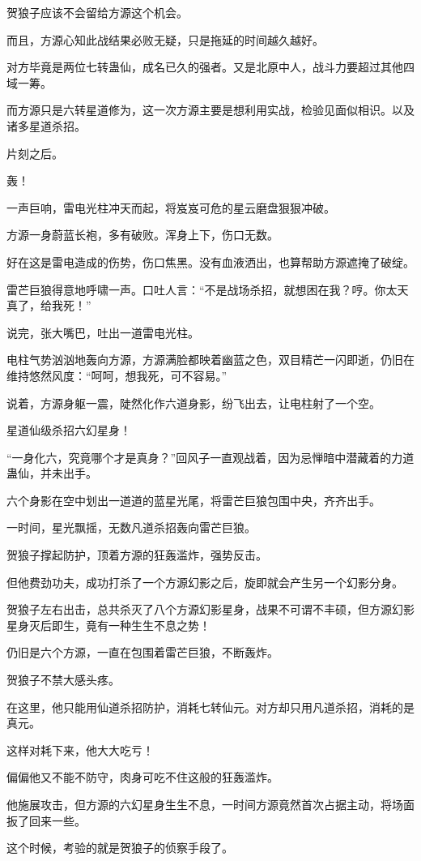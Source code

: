 \begin{this_body}
贺狼子应该不会留给方源这个机会。

而且，方源心知此战结果必败无疑，只是拖延的时间越久越好。

对方毕竟是两位七转蛊仙，成名已久的强者。又是北原中人，战斗力要超过其他四域一筹。

而方源只是六转星道修为，这一次方源主要是想利用实战，检验见面似相识。以及诸多星道杀招。

片刻之后。

轰！

一声巨响，雷电光柱冲天而起，将岌岌可危的星云磨盘狠狠冲破。

方源一身蔚蓝长袍，多有破败。浑身上下，伤口无数。

好在这是雷电造成的伤势，伤口焦黑。没有血液洒出，也算帮助方源遮掩了破绽。

雷芒巨狼得意地呼啸一声。口吐人言：“不是战场杀招，就想困在我？哼。你太天真了，给我死！”

说完，张大嘴巴，吐出一道雷电光柱。

电柱气势汹汹地轰向方源，方源满脸都映着幽蓝之色，双目精芒一闪即逝，仍旧在维持悠然风度：“呵呵，想我死，可不容易。”

说着，方源身躯一震，陡然化作六道身影，纷飞出去，让电柱射了一个空。

星道仙级杀招六幻星身！

“一身化六，究竟哪个才是真身？”回风子一直观战着，因为忌惮暗中潜藏着的力道蛊仙，并未出手。

六个身影在空中划出一道道的蓝星光尾，将雷芒巨狼包围中央，齐齐出手。

一时间，星光飘摇，无数凡道杀招轰向雷芒巨狼。

贺狼子撑起防护，顶着方源的狂轰滥炸，强势反击。

但他费劲功夫，成功打杀了一个方源幻影之后，旋即就会产生另一个幻影分身。

贺狼子左右出击，总共杀灭了八个方源幻影星身，战果不可谓不丰硕，但方源幻影星身灭后即生，竟有一种生生不息之势！

仍旧是六个方源，一直在包围着雷芒巨狼，不断轰炸。

贺狼子不禁大感头疼。

在这里，他只能用仙道杀招防护，消耗七转仙元。对方却只用凡道杀招，消耗的是真元。

这样对耗下来，他大大吃亏！

偏偏他又不能不防守，肉身可吃不住这般的狂轰滥炸。

他施展攻击，但方源的六幻星身生生不息，一时间方源竟然首次占据主动，将场面扳了回来一些。

这个时候，考验的就是贺狼子的侦察手段了。


\end{this_body}
